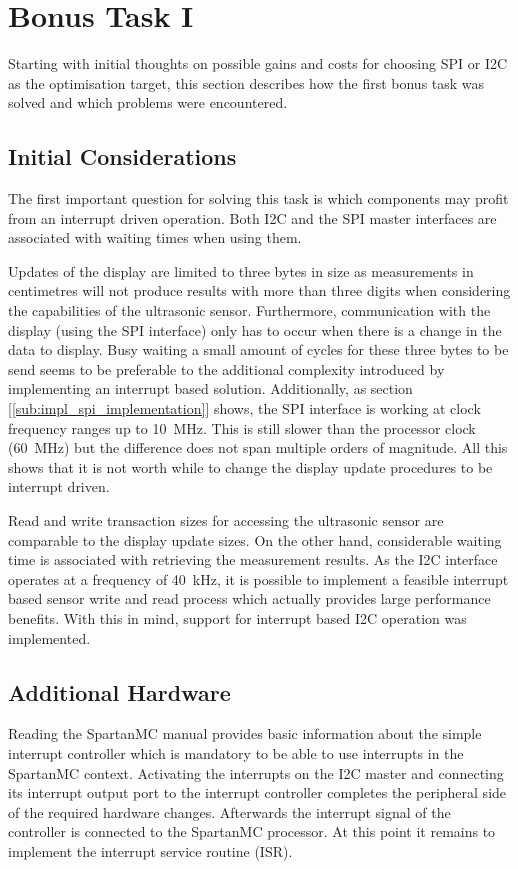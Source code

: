 	\section{Bonus Task I} %
	\label{sec:impl_bonus_task_1}
		Starting with initial thoughts on possible gains and costs for choosing SPI or I2C as the optimisation target, this section describes how the first bonus task was solved and which problems were encountered.

		\subsection{Initial Considerations} %
		\label{sub:initial_considerations}
			The first important question for solving this task is which components may profit from an interrupt driven operation. Both I2C and the SPI master interfaces are associated with waiting times when using them. 

			Updates of the display are limited to three bytes in size as measurements in centimetres will not produce results with more than three digits when considering the capabilities of the ultrasonic sensor. Furthermore, communication with the display (using the SPI interface) only has to occur when there is a change in the data to display. Busy waiting a small amount of cycles for these three bytes to be send seems to be preferable to the additional complexity introduced by implementing an interrupt based solution. Additionally, as section [\ref{sub:impl_spi_implementation}] shows, the SPI interface is working at clock frequency ranges up to \SI{10}{\mega\hertz}. This is still slower than the processor clock (\SI{60}{\mega\hertz}) but the difference does not span multiple orders of magnitude. 
			All this shows that it is not worth while to change the display update procedures to be interrupt driven.

			Read and write transaction sizes for accessing the ultrasonic sensor are comparable to the display update sizes. On the other hand, considerable waiting time is associated with retrieving the measurement results. As the I2C interface operates at a frequency of \SI{40}{\kilo\hertz}, it is possible to implement a feasible interrupt based sensor write and read process which actually provides large performance benefits. With this in mind, support for interrupt based I2C operation was implemented.

		\subsection{Additional Hardware} %
		\label{sub:additional_hardware}
			Reading the SpartanMC manual provides basic information about the simple interrupt controller which is mandatory to be able to use interrupts in the SpartanMC context. Activating the interrupts on the I2C master and connecting its interrupt output port to the interrupt controller completes the peripheral side of the required hardware changes. Afterwards the interrupt signal of the controller is connected to the SpartanMC processor. At this point it remains to implement the interrupt service routine (ISR).


